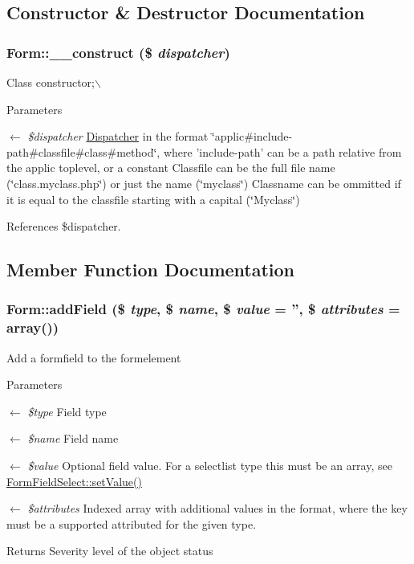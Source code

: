 \subsection{Constructor \& Destructor Documentation}
\subsubsection[{\_\-\_\-construct}]{\setlength{\rightskip}{0pt plus 5cm}Form::\_\-\_\-construct (\$ {\em dispatcher})}\label{classForm_ad0247731b52213ae543452da25da005b}
Class constructor;$\backslash$ 
\begin{DoxyParams}{Parameters}
\item[\mbox{$\leftarrow$} {\em \$dispatcher}]\hyperlink{classDispatcher}{Dispatcher} in the format \char`\"{}applic\#include-\/path\#classfile\#class\#method\char`\"{}, where 'include-\/path' can be a path relative from the applic toplevel, or a constant Classfile can be the full file name (\char`\"{}class.myclass.php\char`\"{}) or just the name (\char`\"{}myclass\char`\"{}) Classname can be ommitted if it is equal to the classfile starting with a capital (\char`\"{}Myclass\char`\"{}) \end{DoxyParams}


References \$dispatcher.



\subsection{Member Function Documentation}
\subsubsection[{addField}]{\setlength{\rightskip}{0pt plus 5cm}Form::addField (\$ {\em type}, \/  \$ {\em name}, \/  \$ {\em value} = {\ttfamily ''}, \/  \$ {\em attributes} = {\ttfamily array()})}\label{classForm_a880197a858a70581146d6f0d275eff02}
Add a formfield to the formelement 
\begin{DoxyParams}{Parameters}
\item[\mbox{$\leftarrow$} {\em \$type}]Field type \item[\mbox{$\leftarrow$} {\em \$name}]Field name \item[\mbox{$\leftarrow$} {\em \$value}]Optional field value. For a selectlist type this must be an array, see \hyperlink{classFormFieldSelect_ae69f5b352df63796c048dca6a2de7544}{FormFieldSelect::setValue()} \item[\mbox{$\leftarrow$} {\em \$attributes}]Indexed array with additional values in the format, where the key must be a supported attributed for the given type. \end{DoxyParams}
\begin{DoxyReturn}{Returns}
Severity level of the object status 
\end{DoxyReturn}


